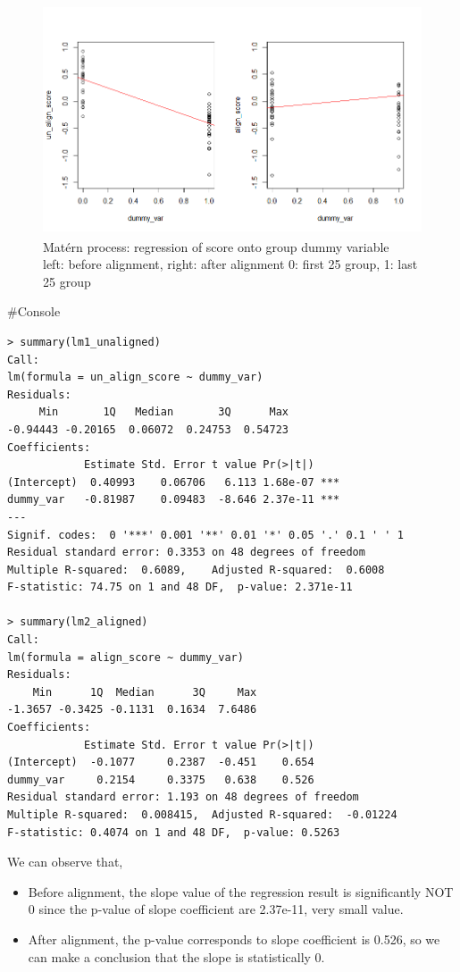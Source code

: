 \documentclass{article}
\newenvironment{console}%
{%
    \begin{mdframed}
    \#Console
    \begin{small}
}
{%
    \end{small}
    \end{mdframed}
}
\begin{document}
\begin{figure}[hh]
    \centering
    \includegraphics[height=6.8cm]{matern_score_reg.png}
    \caption{Mat\'{e}rn process: regression of score onto group dummy variable\\
    left: before alignment, right: after alignment
    0: first 25 group, 1: last 25 group
    }
\end{figure}
\begin{console}
    \begin{verbatim}
> summary(lm1_unaligned)
Call:
lm(formula = un_align_score ~ dummy_var)
Residuals:
     Min       1Q   Median       3Q      Max
-0.94443 -0.20165  0.06072  0.24753  0.54723
Coefficients:
            Estimate Std. Error t value Pr(>|t|)
(Intercept)  0.40993    0.06706   6.113 1.68e-07 ***
dummy_var   -0.81987    0.09483  -8.646 2.37e-11 ***
---
Signif. codes:  0 '***' 0.001 '**' 0.01 '*' 0.05 '.' 0.1 ' ' 1
Residual standard error: 0.3353 on 48 degrees of freedom
Multiple R-squared:  0.6089,    Adjusted R-squared:  0.6008
F-statistic: 74.75 on 1 and 48 DF,  p-value: 2.371e-11

> summary(lm2_aligned)
Call:
lm(formula = align_score ~ dummy_var)
Residuals:
    Min      1Q  Median      3Q     Max
-1.3657 -0.3425 -0.1131  0.1634  7.6486
Coefficients:
            Estimate Std. Error t value Pr(>|t|)
(Intercept)  -0.1077     0.2387  -0.451    0.654
dummy_var     0.2154     0.3375   0.638    0.526
Residual standard error: 1.193 on 48 degrees of freedom
Multiple R-squared:  0.008415,  Adjusted R-squared:  -0.01224
F-statistic: 0.4074 on 1 and 48 DF,  p-value: 0.5263
    \end{verbatim}
\end{console}

We can observe that,
\begin{itemize}
    \item {Before alignment, the slope value of the regression result is significantly NOT 0 
    since the p-value of slope coefficient are 2.37e-11, very small value.}
    \item {After alignment, the p-value corresponds to slope coefficient is 0.526, so we can make a
    conclusion that the slope is statistically 0.
    }
\end{itemize}
\end{document}
